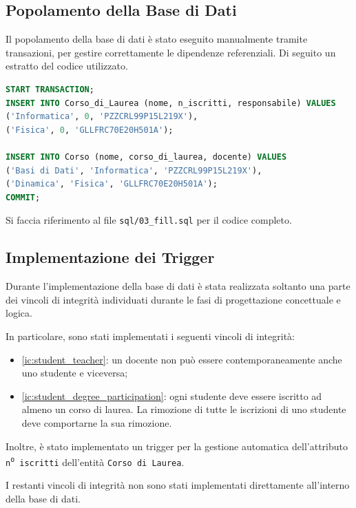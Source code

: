 \documentclass[a4paper,11pt]{article}
\begin{document}
\subsection{Popolamento della Base di Dati}

Il popolamento della base di dati è stato eseguito manualmente tramite transazioni, per gestire correttamente le dipendenze referenziali. Di seguito un estratto del codice utilizzato.

\begin{lstlisting}[language=SQL, title={Estratto del popolamento del database}]
START TRANSACTION;
INSERT INTO Corso_di_Laurea (nome, n_iscritti, responsabile) VALUES 
('Informatica', 0, 'PZZCRL99P15L219X'),
('Fisica', 0, 'GLLFRC70E20H501A');

INSERT INTO Corso (nome, corso_di_laurea, docente) VALUES 
('Basi di Dati', 'Informatica', 'PZZCRL99P15L219X'),
('Dinamica', 'Fisica', 'GLLFRC70E20H501A');
COMMIT;
\end{lstlisting}

Si faccia riferimento al file \texttt{sql/03\_fill.sql} per il codice completo.

\subsection{Implementazione dei Trigger}

Durante l'implementazione della base di dati è stata realizzata soltanto una parte dei vincoli di integrità individuati durante le fasi di progettazione concettuale e logica.

In particolare, sono stati implementati i seguenti vincoli di integrità:

\begin{itemize}
    \item \ref{ic:student_teacher}: un docente non può essere contemporaneamente anche uno studente e viceversa;
    \item \ref{ic:student_degree_participation}: ogni studente deve essere iscritto ad almeno un corso di laurea. La rimozione di tutte le iscrizioni di uno studente deve comportarne la sua rimozione.
\end{itemize}

Inoltre, è stato implementato un trigger per la gestione automatica dell'attributo \texttt{n\textsuperscript{o} iscritti} dell'entità \texttt{Corso di Laurea}.

I restanti vincoli di integrità non sono stati implementati direttamente all'interno della base di dati.
\end{document}
